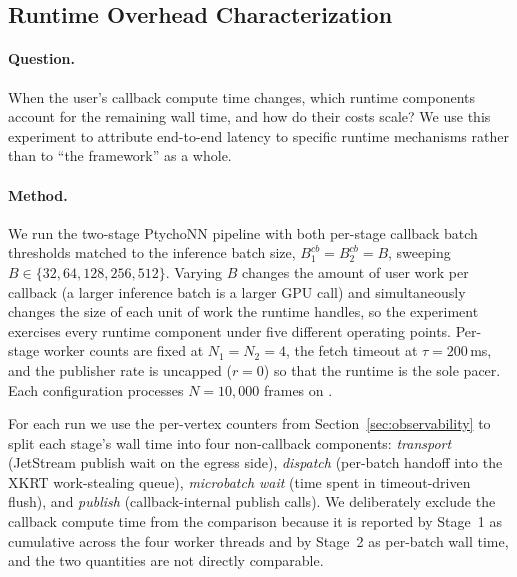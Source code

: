 %
%
%

\subsection{Runtime Overhead Characterization}
\label{sec:exp-runtime-overhead}

\paragraph{Question.}
When the user's callback compute time changes, which \drava{} runtime
components account for the remaining wall time, and how do their costs
scale?  We use this experiment to attribute end-to-end latency to specific
runtime mechanisms rather than to ``the framework'' as a whole.

\paragraph{Method.}
We run the two-stage PtychoNN pipeline with both per-stage callback batch
thresholds matched to the inference batch size, $B^{cb}_1 = B^{cb}_2 = B$,
sweeping $B \in \{32, 64, 128, 256, 512\}$.  Varying $B$ changes the
amount of user work per callback (a larger inference batch is a larger
GPU call) and simultaneously changes the size of each unit of work the
runtime handles, so the experiment exercises every runtime component
under five different operating points.  Per-stage worker counts are
fixed at $N_1 = N_2 = 4$, the fetch timeout at $\tau = 200$\,ms, and the
publisher rate is uncapped ($r = 0$) so that the runtime is the sole
pacer.  Each configuration processes $N = 10{,}000$ frames on
.

For each run we use the per-vertex counters from
Section~\ref{sec:observability} to split each stage's wall time into
four non-callback components: \emph{transport} (JetStream publish wait on
the egress side), \emph{dispatch} (per-batch handoff into the XKRT
work-stealing queue), \emph{microbatch wait} (time spent in
timeout-driven flush), and \emph{publish} (callback-internal publish
calls).  We deliberately exclude the callback compute time from the
comparison because it is reported by Stage~1 as cumulative across the
four worker threads and by Stage~2 as per-batch wall time, and the two
quantities are not directly comparable.


